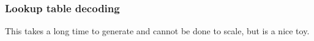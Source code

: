 \subsubsection{Lookup table decoding}
This takes a long time to generate and cannot be done to scale,
but is a nice toy.